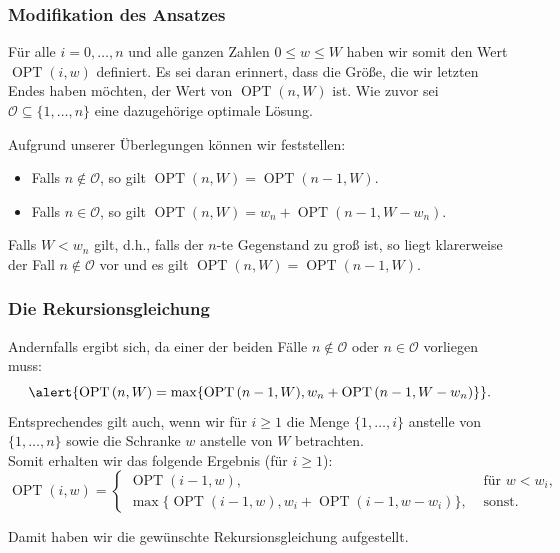 \documentclass[smaller]{beamer}
\renewcommand{\O}{\mathcal{O}}
\DeclareMathOperator{\opt}{OPT}
\begin{document}
\begin{frame}
 \frametitle{Modifikation des Ansatzes}
 Für alle $i=0,\ldots,n$ und alle ganzen Zahlen $0 \leq w \leq W$ haben wir somit den Wert $\opt{(i,w)}$ definiert. Es sei daran erinnert, dass die Größe, die wir letzten Endes haben möchten, der Wert von $\opt{(n,W)}$ ist. Wie zuvor sei $\O \subseteq \bigl\{ 1,\ldots,n \bigr\}$ eine dazugehörige optimale Lösung. \\ \medskip
 
 Aufgrund unserer Überlegungen können wir feststellen:
\begin{itemize}
\item \alert{Falls $n \notin \O$, so gilt $\opt{(n,W)} = \opt{(n-1,W)}$.}
\item \alert{Falls $n \in \O$, so gilt $\opt{(n,W)} = w_n + \opt{(n-1,W-w_n)}$.}
\end{itemize} \medskip

Falls $W < w_n$ gilt, d.h., falls der $n$-te Gegenstand zu groß ist, so liegt klarerweise der Fall $n \notin \O$ vor und es gilt $\opt{(n,W)}=\opt{(n-1,W)}$. 
\end{frame}

\begin{frame}
 \frametitle{Die Rekursionsgleichung}
 Andernfalls ergibt sich, da einer der beiden Fälle $n \notin \O$ oder $n \in \O$ vorliegen muss:
\[
\alert{\opt{(n,W)} = \max\{ \opt{(n-1,W)}, w_n + \opt{(n-1, W-w_n)} \}}.
\]\medskip
 Entsprechendes gilt auch, wenn wir für $i \geq 1$ die Menge $\{ 1,\ldots,i \}$ anstelle von $\{ 1,\ldots,n \}$ sowie die Schranke $w$ anstelle von $W$ betrachten.
 \\ \medskip
 Somit erhalten wir das folgende Ergebnis (für $i \geq 1$):
\begin{equation}
\label{eq:13:3}
\opt{(i,w)} = \begin{cases}
\opt{(i-1,w)}, & \text{ für } w < w_i, \\
\max\{ \opt{(i-1,w)}, w_i + \opt{(i-1, w-w_i)} \}, & \text{ sonst.}
\end{cases}
\end{equation}

Damit haben wir die gewünschte \alert{Rekursionsgleichung} aufgestellt. 
\end{frame}
\end{document}
